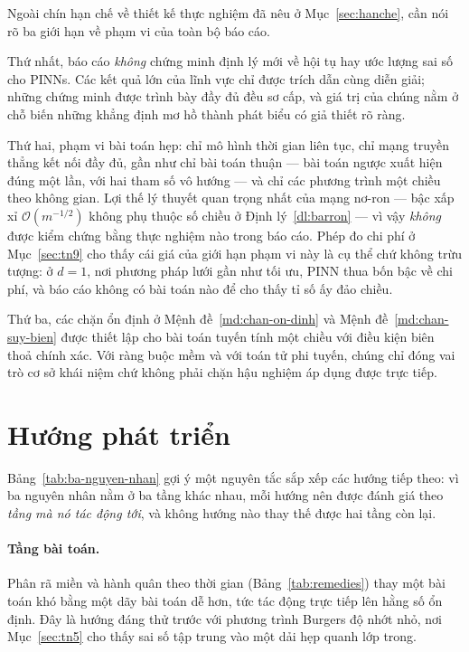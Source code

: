 Ngoài chín hạn chế về thiết kế thực nghiệm đã nêu ở Mục~\ref{sec:hanche}, cần nói
rõ ba giới hạn về phạm vi của toàn bộ báo cáo.

Thứ nhất, báo cáo \emph{không} chứng minh định lý mới về hội tụ hay ước lượng
sai số cho PINNs. Các kết quả lớn của lĩnh vực chỉ được trích dẫn cùng diễn giải;
những chứng minh được trình bày đầy đủ đều sơ cấp, và giá trị của chúng nằm ở chỗ
biến những khẳng định mơ hồ thành phát biểu có giả thiết rõ ràng.

Thứ hai, phạm vi bài toán hẹp: chỉ mô hình thời gian liên tục, chỉ mạng truyền
thẳng kết nối đầy đủ, gần như chỉ bài toán thuận --- bài toán ngược xuất hiện
đúng một lần, với hai tham số vô hướng --- và chỉ các phương trình một chiều theo
không gian. Lợi thế lý thuyết quan trọng nhất của mạng nơ-ron --- bậc xấp xỉ
$\mathcal{O}(m^{-1/2})$ không phụ thuộc số chiều ở Định lý~\ref{dl:barron} ---
vì vậy \emph{không} được kiểm chứng bằng thực nghiệm nào trong báo cáo. Phép đo
chi phí ở Mục~\ref{sec:tn9} cho thấy cái giá của giới hạn phạm vi này là cụ thể
chứ không trừu tượng: ở $d = 1$, nơi phương pháp lưới gần như tối ưu, PINN thua
bốn bậc về chi phí, và báo cáo không có bài toán nào để cho thấy tỉ số ấy đảo
chiều.

Thứ ba, các chặn ổn định ở Mệnh đề~\ref{md:chan-on-dinh} và
Mệnh đề~\ref{md:chan-suy-bien} được thiết lập cho bài toán tuyến tính một chiều
với điều kiện biên thoả chính xác. Với ràng buộc mềm và với toán tử phi tuyến,
chúng chỉ đóng vai trò cơ sở khái niệm chứ không phải chặn hậu nghiệm áp dụng
được trực tiếp.

\section{Hướng phát triển}
\label{sec:huong-phat-trien}

Bảng~\ref{tab:ba-nguyen-nhan} gợi ý một nguyên tắc sắp xếp các hướng tiếp theo:
vì ba nguyên nhân nằm ở ba tầng khác nhau, mỗi hướng nên được đánh giá theo
\emph{tầng mà nó tác động tới}, và không hướng nào thay thế được hai tầng còn
lại.

\paragraph{Tầng bài toán.} Phân rã miền và hành quân theo thời gian
(Bảng~\ref{tab:remedies}) thay một bài toán khó bằng một dãy bài toán dễ hơn, tức
tác động trực tiếp lên hằng số ổn định. Đây là hướng đáng thử trước với phương
trình Burgers độ nhớt nhỏ, nơi Mục~\ref{sec:tn5} cho thấy sai số tập trung vào
một dải hẹp quanh lớp trong.

